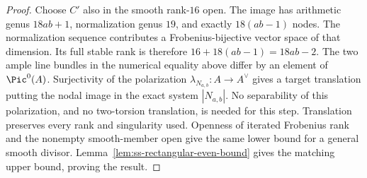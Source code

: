 \begin{proof}
Choose $C'$ also in the smooth rank-$16$ open.  The image has
arithmetic genus $18ab+1$, normalization genus $19$, and exactly
$18(ab-1)$ nodes.  The normalization sequence contributes a
Frobenius-bijective vector space of that dimension.  Its full stable
rank is therefore $16+18(ab-1)=18ab-2$.
The two ample line bundles in the numerical equality above differ
by an element of $\Pic^0(A)$.  Surjectivity of the polarization
$\lambda_{N_{a,b}}:A\to A^\vee$ gives a target translation putting
the nodal image in the exact system $|N_{a,b}|$.  No separability of
this polarization, and no two-torsion translation, is needed for
this step.  Translation preserves every rank and singularity used.
Openness of iterated Frobenius rank and the nonempty smooth-member
open give the same lower bound for a general smooth divisor.
Lemma~\ref{lem:ss-rectangular-even-bound} gives the matching upper
bound, proving the result.
\end{proof}

